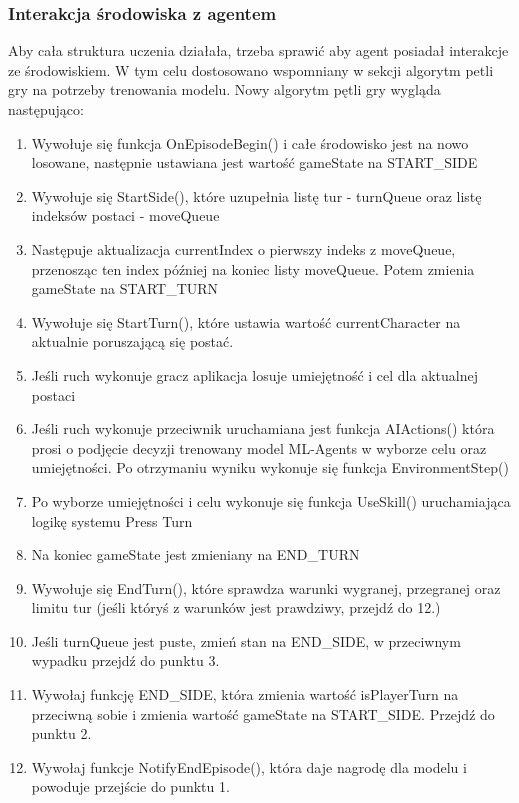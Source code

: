 \documentclass{SGGW-thesis}
\begin{document}
\subsubsection{Interakcja środowiska z agentem}
Aby cała struktura uczenia działała, trzeba sprawić aby agent posiadał interakcje ze środowiskiem. W tym celu dostosowano wspomniany w sekcji  algorytm petli gry na potrzeby trenowania modelu.
Nowy algorytm pętli gry wygląda następująco:
\begin{enumerate}
  \item{Wywołuje się funkcja OnEpisodeBegin() i całe środowisko jest na nowo losowane, następnie ustawiana jest wartość gameState na START\_SIDE}
  \item{Wywołuje się StartSide(), które uzupełnia listę tur - turnQueue oraz listę indeksów postaci - moveQueue}
  \item{Następuje aktualizacja currentIndex o pierwszy indeks z moveQueue, przenosząc ten index później na koniec listy moveQueue. Potem zmienia gameState na START\_TURN}
  \item{Wywołuje się StartTurn(), które ustawia wartość currentCharacter na aktualnie poruszającą się postać.}
  \item{Jeśli ruch wykonuje gracz aplikacja losuje umiejętność i cel dla aktualnej postaci}
  \item{Jeśli ruch wykonuje przeciwnik uruchamiana jest funkcja AIActions() która prosi o podjęcie decyzji trenowany model ML-Agents w wyborze celu oraz umiejętności. Po otrzymaniu wyniku wykonuje się funkcja EnvironmentStep()}
  \item{Po wyborze umiejętności i celu wykonuje się funkcja UseSkill() uruchamiająca logikę systemu Press Turn}
  \item{Na koniec gameState jest zmieniany na END\_TURN}
  \item{Wywołuje się EndTurn(), które sprawdza warunki wygranej, przegranej oraz limitu tur (jeśli któryś z warunków jest prawdziwy, przejdź do 12.)}
  \item{Jeśli turnQueue jest puste, zmień stan na END\_SIDE, w przeciwnym wypadku przejdź do punktu 3.}
  \item{Wywołaj funkcję END\_SIDE, która zmienia wartość isPlayerTurn na przeciwną sobie i zmienia wartość gameState na START\_SIDE. Przejdź do punktu 2.}
  \item{Wywołaj funkcje NotifyEndEpisode(), która daje nagrodę dla modelu i powoduje przejście do punktu 1.}
\end{enumerate}
\pagebreak
\end{document}

